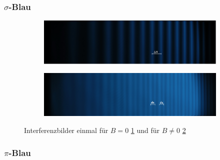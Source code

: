 \subsubsection{\texorpdfstring{$\sigma$}{TEXT}-Blau}

\begin{figure}
   \centering
   \begin{subfigure}{0.9\textwidth}
     \centering
     \includegraphics[width=1\textwidth]{blau_sigma_B=0.jpg}
     \caption{}
     \label{fig:blau_sigB=0}
   \end{subfigure}
   \begin{subfigure}{0.9\textwidth}
     \centering
     \includegraphics[width=1\textwidth]{blau_sigma_B=!0.jpg}
     \caption{}
     \label{fig:blau_sigB=!0}
   \end{subfigure}
\caption{Interferenzbilder einmal für $B=0$ \ref{fig:blau_sigB=0} und für $B\neq0$ \ref{fig:blau_sigB=!0}}
\label{fig:blau_sig}
\end{figure}



\FloatBarrier
\subsubsection{\texorpdfstring{$\pi$}{TEXT}-Blau}

